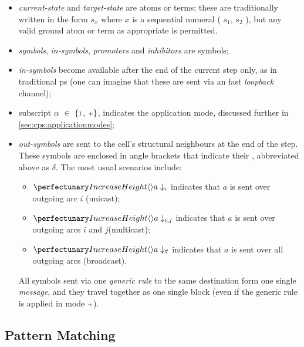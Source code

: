 \begin{itemize}
\item \textit{current-state} and \textit{target-state} are atoms or terms;  these are traditionally written in the form \(s_x\) where \(x\) is a sequential numeral (\eg{} \(s_1\), \(s_2\) \etc{}), but any valid ground atom or term as appropriate is permitted.

\smallskip
\item \textit{symbols}, \textit{in-symbols}, \textit{promoters} and \textit{inhibitors} are symbols;

\smallskip
\item \textit{in-symbols} become available after the end of the current step only, as in traditional \gls{ps}  (one can imagine that these are sent via an \adhoc{} fast \textit{loopback} channel); 

\smallskip
\item subscript \(\alpha\) \(\in\) \(\{{\scriptstyle 1}\), \({\scriptstyle +}\}\), 
indicates the application mode, discussed further in \cref{sec:cps:applicationmodes};

\smallskip
\item \textit{out-symbols} are sent to the cell's structural neighbours at the end of the step.
These symbols are enclosed in angle brackets that indicate 
their , abbreviated above as \(\delta\). 
The most usual scenarios include: 

\begin{itemize}
\item \(\cpoutsymbol{a}{i}\) indicates that \(a\) is sent over outgoing arc \(i\) (unicast); 

\item \(\cpoutsymbol{a}{i,j}\) indicates that \(a\) is sent over outgoing arcs \(i\) and \(j\)(multicast); 

\item \(\cpoutsymbolall{a}\) indicates that \(a\) is sent over all outgoing arcs (broadcast). 
\end{itemize}

All symbols sent via one \emph{generic rule} to the same destination form one single \emph{message}, and they travel together as one single block (even if the generic rule is applied in mode \({\scriptstyle +}\)).
\end{itemize}

\subsection{Pattern Matching}

